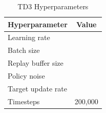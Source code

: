 \begin{table}[h]
\centering
\caption{TD3 Hyperparameters}
\label{tab:hyperparameters}
\begin{tabular}{lc}
\toprule
Hyperparameter & Value \\
\midrule
Learning rate      & \\
Batch size         & \\
Replay buffer size & \\
Policy noise       & \\
Target update rate & \\
Timesteps          & 200{,}000 \\
\bottomrule
\end{tabular}
\end{table}

